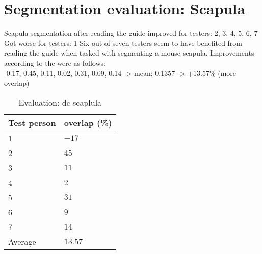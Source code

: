 \section{Segmentation evaluation: Scapula}
Scapula segmentation after reading the guide improved for testers:
2, 3, 4, 5, 6, 7
Got worse for testers:
1
Six out of seven testers seem to have benefited from reading the guide when tasked with segmenting a mouse scapula.
Improvements according to the  were as follows:\\
-0.17, 0.45, 0.11, 0.02, 0.31, 0.09, 0.14 -> mean: 0.1357 -> +13.57\% (more overlap)\\
\begin{table}[ht]
	\begin{center}
		\begin{tabular}{l l}
			\textbf{Test person} & \textbf{overlap (\%)} \\
			\hline
			1                    & $-17$                 \\
			2                    & $45$                  \\
			3                    & $11$                  \\
			4                    & $2$                   \\
			5                    & $31$                  \\
			6                    & $9$                   \\
			7                    & $14$                  \\
			\hline
			Average              & $13.57$               \\
		\end{tabular}
		\caption{Evaluation: \acrshort{dc} scaplula}\label{tab:scapula-overlap}
	\end{center}
\end{table}

